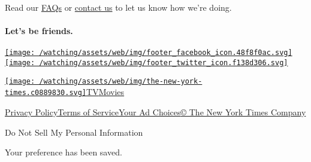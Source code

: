 Read our \href{//www.nytimes.com/2017/01/10/watching/faq.html}{FAQs} or
\href{mailto:watchingcare@nytimes.com}{contact us} to let us know how
we're doing.

\hypertarget{lets-be-friends}{%
\paragraph{Let's be friends.}\label{lets-be-friends}}

\href{https://www.facebook.com/nytwatching/}{\texttt{[image: /watching/assets/web/img/footer\_facebook\_icon.48f8f0ac.svg]}}\href{https://twitter.com/watching}{\texttt{[image: /watching/assets/web/img/footer\_twitter\_icon.f138d306.svg]}}

\href{//www.nytimes.com}{\texttt{[image: /watching/assets/web/img/the-new-york-times.c0889830.svg]}}\href{//www.nytimes.com/section/arts/television}{TV}\href{//www.nytimes.com/section/movies}{Movies}

\href{//www.nytimes.com/content/help/rights/privacy/policy/privacy-policy.html}{Privacy
Policy}\href{//www.nytimes.com/content/help/rights/terms/terms-of-service.html}{Terms
of
Service}\href{//www.nytimes.com/content/help/rights/privacy/policy/privacy-policy.html\#pp}{Your
Ad Choices}\href{http://www.nytco.com/}{© The New York Times Company}

Do Not Sell My Personal Information

Your preference has been saved.
